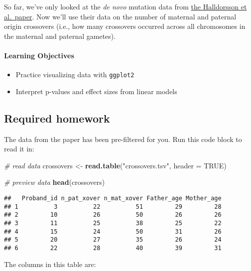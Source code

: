 \documentclass[
]{article}
\newenvironment{Shaded}{\begin{snugshade}}{\end{snugshade}}
\newcommand{\AttributeTok}[1]{\textcolor[rgb]{0.13,0.29,0.53}{#1}}
\newcommand{\CommentTok}[1]{\textcolor[rgb]{0.56,0.35,0.01}{\textit{#1}}}
\newcommand{\ConstantTok}[1]{\textcolor[rgb]{0.56,0.35,0.01}{#1}}
\newcommand{\FunctionTok}[1]{\textcolor[rgb]{0.13,0.29,0.53}{\textbf{#1}}}
\newcommand{\NormalTok}[1]{#1}
\newcommand{\OtherTok}[1]{\textcolor[rgb]{0.56,0.35,0.01}{#1}}
\newcommand{\StringTok}[1]{\textcolor[rgb]{0.31,0.60,0.02}{#1}}
\providecommand{\tightlist}{%
  \setlength{\itemsep}{0pt}\setlength{\parskip}{0pt}}
\begin{document}
So far, we've only looked at the \emph{de novo} mutation data from
\href{https://science.sciencemag.org/content/363/6425/eaau1043}{the
Halldorsson et al.~paper}. Now we'll use their data on the number of
maternal and paternal origin crossovers (i.e., how many crossovers
occurred across all chromosomes in the maternal and paternal gametes).

\paragraph{Learning Objectives}\label{learning-objectives-1}

\begin{itemize}
\tightlist
\item
  Practice visualizing data with \texttt{ggplot2}
\item
  Interpret p-values and effect sizes from linear models
\end{itemize}

\subsection{Required homework}\label{required-homework}

The data from the paper has been pre-filtered for you. Run this code
block to read it in:

\begin{Shaded}
\begin{Highlighting}[]
\CommentTok{\# read data}
\NormalTok{crossovers }\OtherTok{\textless{}{-}} \FunctionTok{read.table}\NormalTok{(}\StringTok{"crossovers.tsv"}\NormalTok{, }\AttributeTok{header =} \ConstantTok{TRUE}\NormalTok{)}

\CommentTok{\# preview data}
\FunctionTok{head}\NormalTok{(crossovers)}
\end{Highlighting}
\end{Shaded}

\begin{verbatim}
##   Proband_id n_pat_xover n_mat_xover Father_age Mother_age
## 1          3          22          51         29         28
## 2         10          26          50         26         26
## 3         11          25          38         25         22
## 4         15          24          50         31         26
## 5         20          27          35         26         24
## 6         22          28          40         39         31
\end{verbatim}

The columns in this table are:
\end{document}
